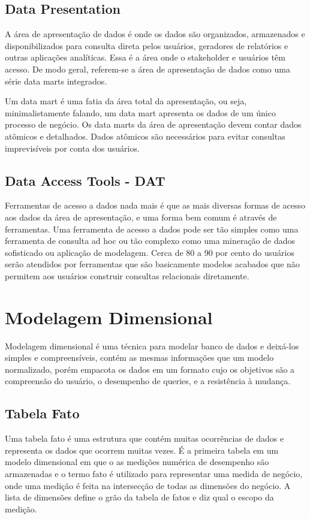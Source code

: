 \subsection{Data Presentation}
A área de apresentação de dados é onde os dados são organizados, armazenados e disponibilizados para consulta direta pelos usuários, geradores de relatórios e outras aplicações analíticas. Essa é a área onde o stakeholder e usuários têm acesso. De modo geral, referem-se a área de apresentação de dados como uma série data marts integrados. \cite{kimball}

Um data mart é uma fatia da área total da apresentação, ou seja, minimalistamente falando, um data mart apresenta os dados de um único processo de negócio. Os data marts da área de apresentação devem contar dados atômicos e detalhados. Dados atômicos são necessários para evitar consultas imprevisíveis por conta dos usuários. \cite{kimball}

\subsection{Data Access Tools - DAT}
Ferramentas de acesso a dados nada mais é que as mais diversas formas de acesso aos dados da área de apresentação, e uma forma bem comum é através de ferramentas. Uma ferramenta de acesso a dados pode ser tão simples como uma ferramenta de consulta ad hoc ou tão complexo como uma mineração de dados sofisticado ou aplicação de modelagem. Cerca de 80 a 90 por cento do usuários serão atendidos por ferramentas que são basicamente modelos acabados que não permitem aos usuários construir consultas relacionais diretamente. \cite{kimball}

\section{Modelagem Dimensional}
Modelagem dimensional é uma técnica para modelar banco de dados e deixá-los simples e compreensíveis, contém as mesmas informações que um modelo normalizado, porém empacota os dados em um formato cujo os objetivos são a compreensão do usuário, o desempenho de queries, e a resistência à mudança. \cite{kimball}

\subsection{Tabela Fato}
Uma tabela fato é uma estrutura que contém muitas ocorrências de dados e representa os dados que ocorrem muitas vezes. É a primeira tabela em um modelo dimensional em que o as medições numérica de desempenho são armazenadas e o termo fato é utilizado para representar uma medida de negócio, onde uma medição é feita na intersecção de todas as dimensões do negócio.  A lista de dimensões define o grão da tabela de fatos e diz qual o escopo da medição. \cite{kimball}


